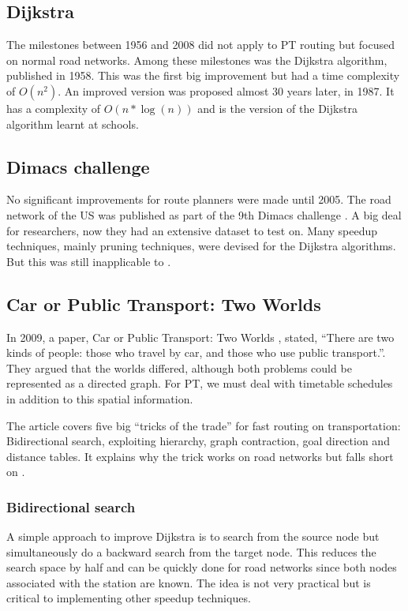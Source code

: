 \subsection{Dijkstra}
The milestones between 1956 and 2008 did not apply to PT routing but focused on normal road networks. Among these milestones was the Dijkstra algorithm, published in 1958. This was the first big improvement but had a time complexity of $O(n^2)$. An improved version was proposed almost 30 years later, in 1987. It has a complexity of $O(n*\log(n))$ and is the version of the Dijkstra algorithm learnt at schools.%
\subsection{Dimacs challenge}
No significant improvements for route planners were made until 2005. The road network of the US was published as part of the 9th Dimacs challenge \cite{noauthor_9th_2017}. A big deal for researchers, now they had an extensive dataset to test on. Many speedup techniques, mainly pruning techniques, were devised for the Dijkstra algorithms. But this was still inapplicable to .

\subsection{Car or Public Transport: Two Worlds}
In 2009, a paper, Car or Public Transport: Two Worlds \cite{bast_car_2009}, stated, “There are two kinds of people: those who travel by car, and those who use public transport.”. They argued that the worlds differed, although both problems could be represented as a directed graph. For PT, we must deal with timetable schedules in addition to this spatial information.

The article covers five big “tricks of the trade” for fast routing on transportation: Bidirectional search, exploiting hierarchy, graph contraction, goal direction and distance tables. It explains why the trick works on road networks but falls short on .

\subsubsection{Bidirectional search}
A simple approach to improve Dijkstra is to search from the source node but simultaneously do a backward search from the target node. This reduces the search space by half and can be quickly done for road networks since both nodes associated with the station are known. The idea is not very practical but is critical to implementing other speedup techniques.

